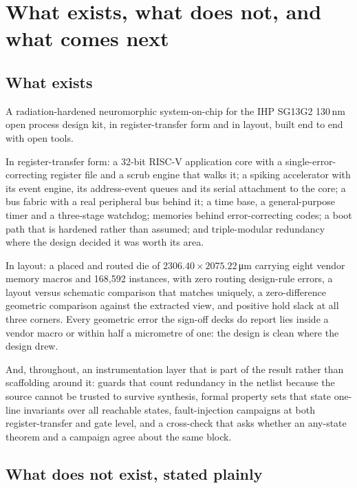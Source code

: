 
\chapter{What exists, what does not, and what comes next}
\label{ch:conclusion}

\section{What exists}

A radiation-hardened neuromorphic system-on-chip for the IHP SG13G2
130\,nm open process design kit, in register-transfer form and in
layout, built end to end with open tools.

In register-transfer form: a 32-bit RISC-V application core with a
single-error-correcting register file and a scrub engine that walks it;
a spiking accelerator with its event engine, its address-event queues
and its serial attachment to the core; a bus fabric with a real
peripheral bus behind it; a time base, a general-purpose timer and a
three-stage watchdog; memories behind error-correcting codes; a boot
path that is hardened rather than assumed; and triple-modular
redundancy where the design decided it was worth its area.

In layout: a placed and routed die of $2306.40 \times
2075.22$\,\si{\um} carrying eight vendor memory macros and
168{,}592 instances, with zero routing design-rule errors, a layout
versus schematic comparison that matches uniquely, a zero-difference
geometric comparison against the extracted view, and positive hold
slack at all three corners. Every geometric error the sign-off decks do
report lies inside a vendor macro or within half a micrometre of one:
the design is clean where the design drew.

And, throughout, an instrumentation layer that is part of the result
rather than scaffolding around it: guards that count redundancy in the
netlist because the source cannot be trusted to survive synthesis,
formal property sets that state one-line invariants over all reachable
states, fault-injection campaigns at both register-transfer and gate
level, and a cross-check that asks whether an any-state theorem and a
campaign agree about the same block.

\section{What does not exist, stated plainly}

